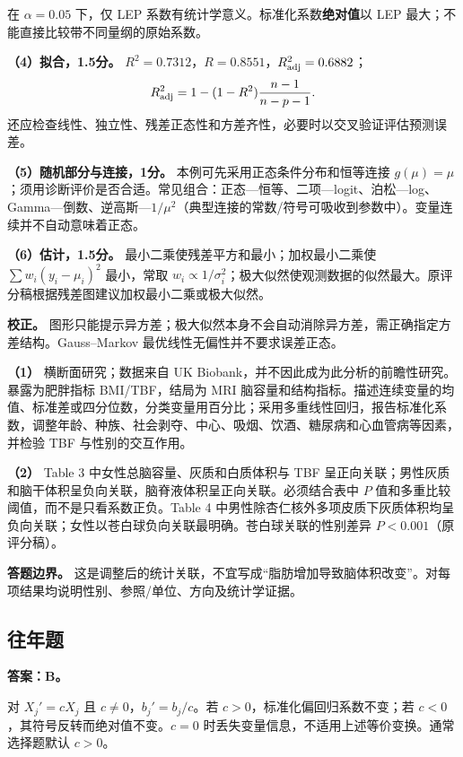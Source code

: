 在 \(\alpha=0.05\) 下，仅 LEP 系数有统计学意义。标准化系数\textbf{绝对值}以 LEP 最大；不能直接比较带不同量纲的原始系数。

\textbf{（4）拟合，1.5分。} \(R^2=0.7312\)，\(R=0.8551\)，\(R^2_{\rm adj}=0.6882\)； \[R^2_{\rm adj}=1-(1-R^2)\frac{n-1}{n-p-1}.\] 还应检查线性、独立性、残差正态性和方差齐性，必要时以交叉验证评估预测误差。

\textbf{（5）随机部分与连接，1分。} 本例可先采用正态条件分布和恒等连接 \(g(\mu)=\mu\)；须用诊断评价是否合适。常见组合：正态---恒等、二项---logit、泊松---log、Gamma---倒数、逆高斯---\(1/\mu^2\)（典型连接的常数/符号可吸收到参数中）。变量连续并不自动意味着正态。

\textbf{（6）估计，1.5分。} 最小二乘使残差平方和最小；加权最小二乘使 \(\sum w_i(y_i-\mu_i)^2\) 最小，常取 \(w_i\propto1/\sigma_i^2\)；极大似然使观测数据的似然最大。原评分稿根据残差图建议加权最小二乘或极大似然。

\textbf{校正。} 图形只能提示异方差；极大似然本身不会自动消除异方差，需正确指定方差结构。Gauss--Markov 最优线性无偏性并不要求误差正态。



\textbf{（1）} 横断面研究；数据来自 UK Biobank，并不因此成为此分析的前瞻性研究。暴露为肥胖指标 BMI/TBF，结局为 MRI 脑容量和结构指标。描述连续变量的均值、标准差或四分位数，分类变量用百分比；采用多重线性回归，报告标准化系数，调整年龄、种族、社会剥夺、中心、吸烟、饮酒、糖尿病和心血管病等因素，并检验 TBF 与性别的交互作用。

\textbf{（2）} Table 3 中女性总脑容量、灰质和白质体积与 TBF 呈正向关联；男性灰质和脑干体积呈负向关联，脑脊液体积呈正向关联。必须结合表中 \(P\) 值和多重比较阈值，而不是只看系数正负。Table 4 中男性除杏仁核外多项皮质下灰质体积均呈负向关联；女性以苍白球负向关联最明确。苍白球关联的性别差异 \(P<0.001\)（原评分稿）。

\textbf{答题边界。} 这是调整后的统计关联，不宜写成``脂肪增加导致脑体积改变''。对每项结果均说明性别、参照/单位、方向及统计学证据。


\subsection{往年题}


\textbf{答案：B。}

对 \(X_j'=cX_j\) 且 \(c\ne0\)，\(b_j'=b_j/c\)。若 \(c>0\)，标准化偏回归系数不变；若 \(c<0\)，其符号反转而绝对值不变。\(c=0\) 时丢失变量信息，不适用上述等价变换。通常选择题默认 \(c>0\)。

